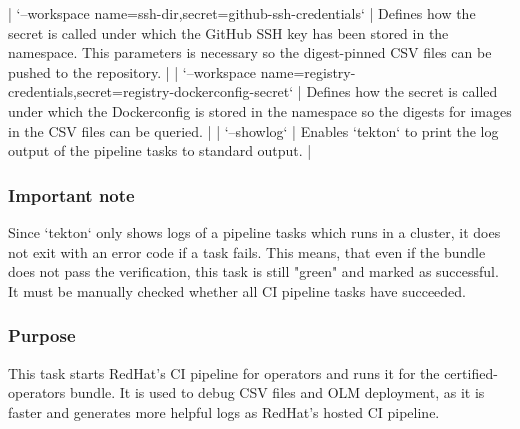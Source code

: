 | `--workspace name=ssh-dir,secret=github-ssh-credentials`                             | Defines how the secret is called under which the GitHub SSH key has been stored in the namespace. This parameters is necessary so the digest-pinned CSV files can be pushed to the repository.                                                                                                                                                                                                                             |
| `--workspace name=registry-credentials,secret=registry-dockerconfig-secret`          | Defines how the secret is called under which the Dockerconfig is stored in the namespace so the digests for images in the CSV files can be queried.                                                                                                                                                                                                                                                                        |
| `--showlog`                                                                          | Enables `tekton` to print the log output of the pipeline tasks to standard output.                                                                                                                                                                                                                                                                                                                                         |

\subsubsection{Important note}\label{subsubsec:test-certified-operators-important-note}

Since `tekton` only shows logs of a pipeline tasks which runs in a cluster, it does not exit with an error code if a task fails.
This means, that even if the bundle does not pass the verification, this task is still "green" and marked as successful.
It must be manually checked whether all CI pipeline tasks have succeeded.

\subsubsection{Purpose}\label{subsubsec:test-certified-operators-purpose}

This task starts RedHat's CI pipeline for operators and runs it for the certified-operators bundle.
It is used to debug CSV files and OLM deployment, as it is faster and generates more helpful logs as RedHat's hosted CI pipeline.
